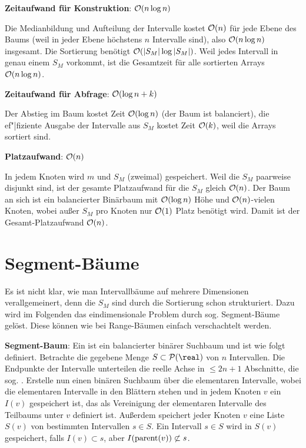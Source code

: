 \linie

\textbf{Zeitaufwand für Konstruktion}:
$\mathcal{O}(n \log n)$

\begin{Beweis}
    Die Medianbildung und Aufteilung der Intervalle kostet $\mathcal{O}(n)$ für jede Ebene des Baums
    (weil in jeder Ebene höchstens $n$ Intervalle sind), also $\mathcal{O}(n \log n)$ insgesamt.
    Die Sortierung benötigt $\mathcal{O}(|S_M| \log |S_M|)$.
    Weil jedes Intervall in genau einem $S_M$ vorkommt, ist die Gesamtzeit für alle sortierten
    Arrays $\mathcal{O}(n \log n)$.
\end{Beweis}

\textbf{Zeitaufwand für Abfrage}:
$\mathcal{O}(\log n + k)$

\begin{Beweis}
    Der Abstieg im Baum kostet Zeit $\mathcal{O}(\log n)$
    (der Baum ist balanciert),
    die ef"|fiziente Ausgabe der Intervalle aus
    $S_M$ kostet Zeit $\mathcal{O}(k)$, weil die Arrays sortiert sind.
\end{Beweis}

\textbf{Platzaufwand}:
$\mathcal{O}(n)$

\begin{Beweis}
    In jedem Knoten wird $m$ und $S_M$ (zweimal) gespeichert.
    Weil die $S_M$ paarweise disjunkt sind, ist der gesamte Platzaufwand für die $S_M$
    gleich $\mathcal{O}(n)$.
    Der Baum an sich ist ein balancierter Binärbaum mit $\mathcal{O}(\log n)$ Höhe und
    $\mathcal{O}(n)$-vielen Knoten, wobei außer $S_M$ pro Knoten nur $\mathcal{O}(1)$ Platz benötigt wird.
    Damit ist der Gesamt-Platzaufwand $\mathcal{O}(n)$.
\end{Beweis}

\pagebreak

\section{%
    Segment-Bäume%
}

Es ist nicht klar, wie man Intervallbäume auf mehrere Dimensionen verallgemeinert,
denn die $S_M$ sind durch die Sortierung schon strukturiert.
Dazu wird im Folgenden das eindimensionale Problem durch sog. Segment-Bäume gelöst.
Diese können wie bei Range-Bäumen einfach verschachtelt werden.

\textbf{Segment-Baum}:
Ein  ist ein balancierter binärer Suchbaum und ist wie folgt definiert.
Betrachte die gegebene Menge $S \subset \P(\real)$ von $n$ Intervallen.
Die Endpunkte der Intervalle unterteilen die reelle Achse in $\le 2n + 1$ Abschnitte,
die sog. .
Erstelle nun einen binären Suchbaum über die elementaren Intervalle,
wobei die elementaren Intervalle in den Blättern stehen und in jedem Knoten $v$
ein  $I(v)$ gespeichert ist,
das als Vereinigung der elementaren Intervalle des Teilbaums unter $v$ definiert ist.
Außerdem speichert jeder Knoten $v$ eine Liste $S(v)$ von bestimmten Intervallen $s \in S$.
Ein Intervall $s \in S$ wird in $S(v)$ gespeichert, falls
$I(v) \subset s$, aber $I(\operatorname{parent}(v)) \not\subset s$.

